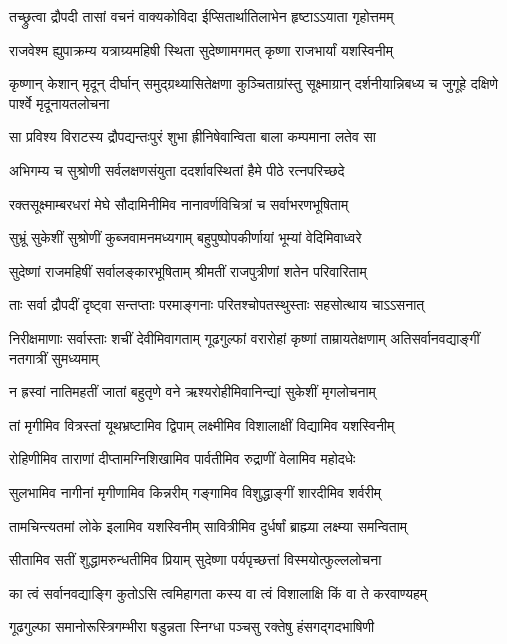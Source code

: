 \twolineshloka
{तच्छ्रुत्वा द्रौपदी तासां वचनं वाक्यकोविदा}
{ईप्सितार्थातिलाभेन हृष्टाऽऽयाता गृहोत्तमम्}


\twolineshloka
{राजवेश्म ह्युपाक्रम्य यत्राग्र्यमहिषी स्थिता}
{सुदेष्णामगमत् कृष्णा राजभार्यां यशस्विनीम्}


\threelineshloka
{कृष्णान् केशान् मृदून् दीर्घान् समुद्ग्रथ्यासितेक्षणा}
{कुञ्चिताग्रांस्तु सूक्ष्माग्रान् दर्शनीयान्निबध्य च}
{जुगूहे दक्षिणे पार्श्वे मृदूनायतलोचना}


\twolineshloka
{सा प्रविश्य विराटस्य द्रौपद्यन्तःपुरं शुभा}
{ह्रीनिषेवान्विता बाला कम्पमाना लतेव सा}


\twolineshloka
{अभिगम्य च सुश्रोणी सर्वलक्षणसंयुता}
{ददर्शावस्थितां हैमे पीठे रत्नपरिच्छदे}


\twolineshloka
{रक्तसूक्ष्माम्बरधरां मेघे सौदामिनीमिव}
{नानावर्णविचित्रां च सर्वाभरणभूषिताम्}


\twolineshloka
{सुभ्रूं सुकेशीं सुश्रोणीं कुब्जवामनमध्यगाम्}
{बहुपुष्पोपकीर्णायां भूम्यां वेदिमिवाध्वरे}


\twolineshloka
{सुदेष्णां राजमहिषीं सर्वालङ्कारभूषिताम्}
{श्रीमतीं राजपुत्रीणां शतेन परिवारिताम्}


\twolineshloka
{ताः सर्वा द्रौपदीं दृष्ट्वा सन्तप्ताः परमाङ्गनाः}
{परितश्चोपतस्थुस्ताः सहसोत्थाय चाऽऽसनात्}


\threelineshloka
{निरीक्षमाणाः सर्वास्ताः शचीं देवीमिवागताम्}
{गूढगुल्फां वरारोहां कृष्णां ताम्रायतेक्षणाम्}
{अतिसर्वानवद्याङ्गीं नतगात्रीं सुमध्यमाम्}


\twolineshloka
{न ह्रस्वां नातिमहतीं जातां बहुतृणे वने}
{ऋश्यरोहीमिवानिन्द्यां सुकेशीं मृगलोचनाम्}


\twolineshloka
{तां मृगीमिव वित्रस्तां यूथभ्रष्टामिव द्विपाम्}
{लक्ष्मीमिव विशालाक्षीं विद्यामिव यशस्विनीम्}


\twolineshloka
{रोहिणीमिव ताराणां दीप्तामग्निशिखामिव}
{पार्वतीमिव रुद्राणीं वेलामिव महोदधेः}


\twolineshloka
{सुलभामिव नागीनां मृगीणामिव किन्नरीम्}
{गङ्गामिव विशुद्धाङ्गीं शारदीमिव शर्वरीम्}


\twolineshloka
{तामचिन्त्यतमां लोके इलामिव यशस्विनीम्}
{सावित्रीमिव दुर्धर्षां ब्राह्म्या लक्ष्म्या समन्विताम्}


\twolineshloka
{सीतामिव सतीं शुद्धामरुन्धतीमिव प्रियाम्}
{सुदेष्णा पर्यपृच्छत्तां विस्मयोत्फुल्ललोचना}


\twolineshloka
{का त्वं सर्वानवद्याङ्गि कुतोऽसि त्वमिहागता}
{कस्य वा त्वं विशालाक्षि किं वा ते करवाण्यहम्}


\twolineshloka
{गूढगुल्फा समानोरूस्त्रिगम्भीरा षडुन्नता}
{स्निग्धा पञ्चसु रक्तेषु हंसगद्गदभाषिणी}


